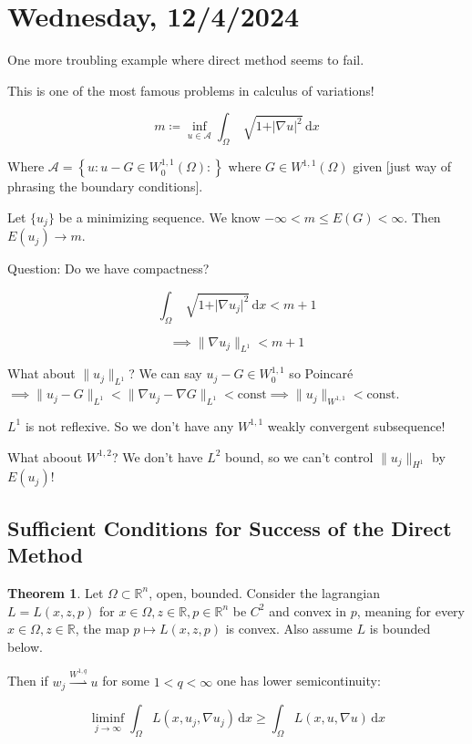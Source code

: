 \documentclass{article}
\theoremstyle{definition}
\newtheorem{theorem}{Theorem}
\begin{document}
\section*{Wednesday, 12/4/2024}

One more troubling example where direct method seems to fail.

This is one of the most famous problems in calculus of variations!

\[
    m \coloneqq \inf_{u\in \mathcal{A}} \int_{\Omega} \sqrt[]{1 + \vert \nabla u \vert ^ 2} \,\mathrm{d}x 
\]

Where \(\mathcal{A} = \left\{ u : u - G \in W_0^{1,1}(\Omega) :  \right\}\) where \(G \in W^{1,1}(\Omega)\) given [just way of phrasing the boundary conditions].

Let \(\{ u_j \}\) be a minimizing sequence. We know \(- \infty < m \leq E(G) < \infty\). Then \(E(u_j) \to m\).

Question: Do we have compactness?

\[
    \int_{\Omega} \sqrt[]{1 + \vert \nabla u_j \vert^2}  \,\mathrm{d}x < m + 1
\]

\[
    \implies \lVert \nabla u_j \rVert _{L^1} < m+1
\]

What about \(\lVert u_j \rVert _{L^1}\)? We can say \(u_j - G \in W^{1,1}_0\) so Poincar\'e \(\implies \lVert u_j - G \rVert _{L^1} < \lVert \nabla u_j - \nabla G \rVert _{L^1} < \text{const} \implies \lVert u_j \rVert _{W^{1,1}} < \text{const}\).

\(L^1\) is not reflexive. So we don't have any \(W^{1,1}\) weakly convergent subsequence!

What aboout \(W^{1,2}\)? We don't have \(L^2\) bound, so we can't control \(\lVert u_j \rVert _{H^1}\) by \(E(u_j)\)!

\subsection*{Sufficient Conditions for Success of the Direct Method}

\begin{theorem}
    Let \(\Omega \subset \mathbb{R}^n\), open, bounded. Consider the lagrangian \(L = L(x,z,p)\) for \(x \in \Omega, z \in \mathbb{R} , p \in \mathbb{R}^n\) be \(C^2\) and convex in \(p\), meaning for every \(x\in \Omega , z\in \mathbb{R}\), the map \(p \mapsto L(x,z,p)\) is convex. Also assume \(L\) is bounded below.

    Then if \(w_j \overset{W^{1,q}}{\rightharpoonup} u\) for some \(1 < q < \infty\) one has lower semicontinuity:
    
    \[
        \liminf_{j \to \infty} \int_{\Omega} L(x, u_j, \nabla u_j) \,\mathrm{d}x \geq \int_{\Omega} L(x,u,\nabla u) \,\mathrm{d}x 
    \]

\end{theorem}
\end{document}

